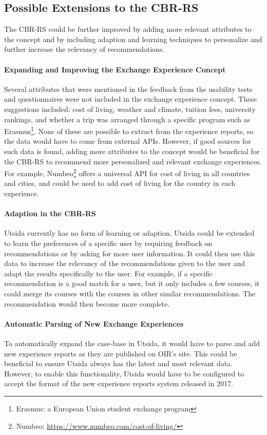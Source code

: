 \subsection{Possible Extensions to the CBR-RS}
The CBR-RS could be further improved by adding more relevant attributes to the concept and by including adaption and learning techniques to personalize and further increase the relevancy of recommendations.

\paragraph{Expanding and Improving the Exchange Experience Concept} Several attributes that were mentioned in the feedback from the usability tests and questionnaires were not included in the exchange experience concept. These suggestions included: cost of living, weather and climate, tuition fees, university rankings, and whether a trip was arranged through a specific program such as Erasmus\footnote{Erasmus: a European Union student exchange program}. None of these are possible to extract from the experience reports, so the data would have to come from external APIs. However, if good sources for such data is found, adding more attributes to the concept would be beneficial for the CBR-RS to recommend more personalized and relevant exchange experiences. For example, Numbeo\footnote{Numbeo: \url{https://www.numbeo.com/cost-of-living/}} offers a universal API for cost of living in all countries and cities, and could be used to add cost of living for the country in each experience. 

\paragraph{Adaption in the CBR-RS} Utsida currently has no form of learning or adaption. Utsida could be extended to learn the preferences of a specific user by requiring feedback on recommendations or by asking for more user information. It could then use this data to increase the relevancy of the recommendations given to the user and adapt the results specifically to the user. For example, if a specific recommendation is a good match for a user, but it only includes a few courses, it could merge its courses with the courses in other similar recommendations. The recommendation would then become more complete. 

\paragraph{Automatic Parsing of New Exchange Experiences} To automatically expand the case-base in Utsida, it would have to parse and add new experience reports as they are published on OIR's site. This could be beneficial to ensure Utsida always has the latest and most relevant data. However, to enable this functionality, Utsida would have to be configured to accept the format of the new experience reports system released in 2017.  


